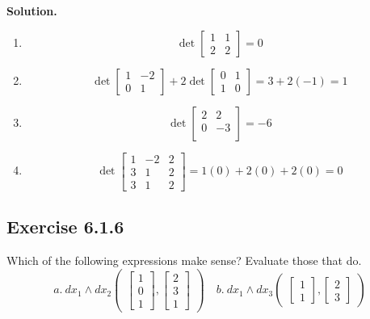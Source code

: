 \documentclass[12pt]{article}
\begin{document}
\textbf{Solution.}
\begin{enumerate}
  \item \[
    \det \begin{bmatrix}
      1 & 1 \\
      2 & 2 
    \end{bmatrix}
    = 0
  \]
  \item \[
    \det \begin{bmatrix}
      1 & -2 \\
      0 & 1
    \end{bmatrix}
    + 2 \det \begin{bmatrix}
      0 & 1 \\
      1 & 0
    \end{bmatrix}
    = 3 + 2(-1)
    = 1
  \]
  \item \[
    \det \begin{bmatrix}
      2 & 2 \\
      0 & -3 \\
    \end{bmatrix}
    = -6
  \]
  \item \[
    \det \begin{bmatrix}
      1 & -2 & 2 \\
      3 & 1 & 2 \\
      3 & 1 & 2 
    \end{bmatrix}
    = 1(0) + 2(0) + 2(0)
    = 0
  \]
\end{enumerate}
\newpage


\subsection*{Exercise 6.1.6}
Which of the following expressions make sense? Evaluate those that do.
$$a.\ dx_1\wedge dx_2
        \begin{pmatrix}
          \begin{bmatrix}
            1\\0\\1
          \end{bmatrix},
          \begin{bmatrix}
           2\\3\\1
         \end{bmatrix}
    \end{pmatrix}
    \quad
    b.\ dx_1\wedge dx_3
     \begin{pmatrix}
          \begin{bmatrix}
            1\\1
          \end{bmatrix},
          \begin{bmatrix}
          2\\3
         \end{bmatrix}
    \end{pmatrix}
$$
\end{document}
